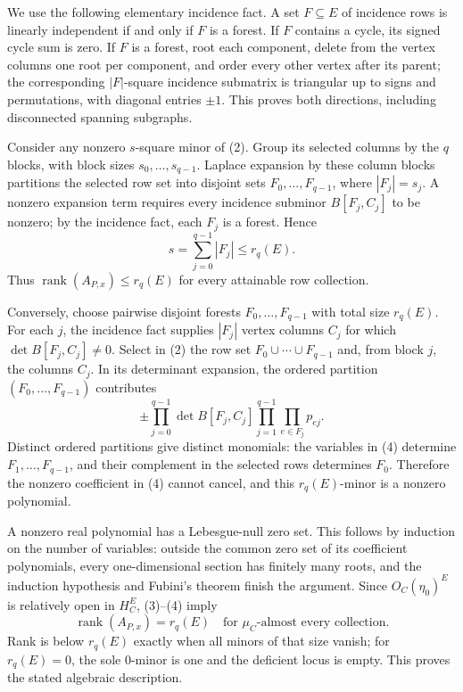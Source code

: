 We use the following elementary incidence fact.  A set \(F\subseteq E\) of incidence rows is linearly independent if and only if \(F\) is a forest.  If \(F\) contains a cycle, its signed cycle sum is zero.  If \(F\) is a forest, root each component, delete from the vertex columns one root per component, and order every other vertex after its parent; the corresponding \(|F|\)-square incidence submatrix is triangular up to signs and permutations, with diagonal entries \(\pm1\).  This proves both directions, including disconnected spanning subgraphs.

Consider any nonzero \(s\)-square minor of (2).  Group its selected columns by the \(q\) blocks, with block sizes \(s_0,\ldots,s_{q-1}\).  Laplace expansion by these column blocks partitions the selected row set into disjoint sets \(F_0,\ldots,F_{q-1}\), where \(|F_j|=s_j\).  A nonzero expansion term requires every incidence subminor \(B[F_j,C_j]\) to be nonzero; by the incidence fact, each \(F_j\) is a forest.  Hence
\[
s=\sum_{j=0}^{q-1}|F_j|\le r_q(E).
\tag{3}
\]
Thus \(\operatorname{rank}(A_{P,x})\le r_q(E)\) for every attainable row collection.

Conversely, choose pairwise disjoint forests \(F_0,\ldots,F_{q-1}\) with total size \(r_q(E)\).  For each \(j\), the incidence fact supplies \(|F_j|\) vertex columns \(C_j\) for which \(\det B[F_j,C_j]\ne0\).  Select in (2) the row set \(F_0\cup\cdots\cup F_{q-1}\) and, from block \(j\), the columns \(C_j\).  In its determinant expansion, the ordered partition \((F_0,\ldots,F_{q-1})\) contributes
\[
\pm\prod_{j=0}^{q-1}\det B[F_j,C_j]
\prod_{j=1}^{q-1}\prod_{e\in F_j}p_{ej}.
\tag{4}
\]
Distinct ordered partitions give distinct monomials: the variables in (4) determine \(F_1,\ldots,F_{q-1}\), and their complement in the selected rows determines \(F_0\).  Therefore the nonzero coefficient in (4) cannot cancel, and this \(r_q(E)\)-minor is a nonzero polynomial.

A nonzero real polynomial has a Lebesgue-null zero set.  This follows by induction on the number of variables: outside the common zero set of its coefficient polynomials, every one-dimensional section has finitely many roots, and the induction hypothesis and Fubini's theorem finish the argument.  Since \(O_C(\eta_0)^E\) is relatively open in \(H_C^E\), (3)--(4) imply
\[
\operatorname{rank}(A_{P,x})=r_q(E)
\quad\text{for }\mu_C\text{-almost every collection}.
\tag{5}
\]
Rank is below \(r_q(E)\) exactly when all minors of that size vanish; for \(r_q(E)=0\), the sole \(0\)-minor is one and the deficient locus is empty.  This proves the stated algebraic description.

